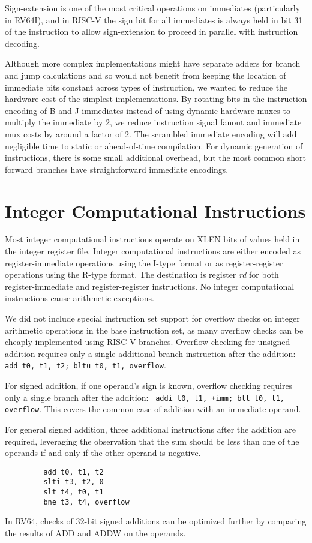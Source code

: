 \begin{commentary}
Sign-extension is one of the most critical operations on immediates
(particularly in RV64I), and in RISC-V the sign bit for all immediates
is always held in bit 31 of the instruction to allow sign-extension to
proceed in parallel with instruction decoding.

Although more complex implementations might have separate adders for
branch and jump calculations and so would not benefit from keeping the
location of immediate bits constant across types of instruction, we
wanted to reduce the hardware cost of the simplest implementations.
By rotating bits in the instruction encoding of B and J immediates
instead of using dynamic hardware muxes to multiply the immediate by
2, we reduce instruction signal fanout and immediate mux costs by
around a factor of 2.  The scrambled immediate encoding will add
negligible time to static or ahead-of-time compilation.  For dynamic
generation of instructions, there is some small additional
overhead, but the most common short forward branches have
straightforward immediate encodings.
\end{commentary}

\section{Integer Computational Instructions}

Most integer computational instructions operate on XLEN bits of values
held in the integer register file.  Integer computational instructions
are either encoded as register-immediate operations using the I-type
format or as register-register operations using the R-type format.
The destination is register {\em rd} for both register-immediate and
register-register instructions.  No integer computational instructions
cause arithmetic exceptions.

\begin{commentary}
We did not include special instruction set support for overflow checks
on integer arithmetic operations in the base instruction set, as many
overflow checks can be cheaply implemented using RISC-V branches.
Overflow checking for unsigned addition requires only a single
additional branch instruction after the addition:
\verb! add t0, t1, t2; bltu t0, t1, overflow!.

For signed addition, if one operand's sign is known, overflow checking
requires only a single branch after the addition:
\verb! addi t0, t1, +imm; blt t0, t1, overflow!.  This covers the
common case of addition with an immediate operand.

For general signed addition, three additional instructions after the
addition are required, leveraging the observation that the sum should
be less than one of the operands if and only if the other operand is
negative.
\begin{verbatim}
         add t0, t1, t2
         slti t3, t2, 0
         slt t4, t0, t1
         bne t3, t4, overflow
\end{verbatim}
In RV64, checks of 32-bit signed additions can be optimized further by
comparing the results of ADD and ADDW on the operands.
\end{commentary}

